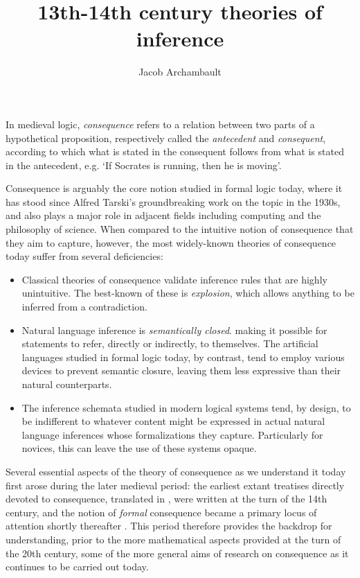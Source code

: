 \documentclass[]{article}
\title{13th-14th century theories of inference}
\author{Jacob Archambault}
\begin{document}
\maketitle

In medieval logic, 
\emph{consequence} refers to a relation between two parts of a hypothetical proposition, 
respectively called the \emph{antecedent} and \emph{consequent}, 
according to which what is stated in the consequent follows from what is stated in the antecedent, 
e.g. `If Socrates is running, then he is moving'. 

Consequence is arguably the core notion studied in formal logic today, 
where it has stood since Alfred Tarski's groundbreaking work on the topic in the 1930s, 
and also plays a major role in adjacent fields including computing and the philosophy of science. 
When compared to the intuitive notion of consequence that they aim to capture, 
however, 
the most widely-known theories of consequence today suffer from several deficiencies: 
\begin{itemize}
	\item Classical theories of consequence validate inference rules that are highly unintuitive. 
	The best-known of these is \emph{explosion}, 
	which allows anything to be inferred from a contradiction.
	\item Natural language inference is \emph{semantically closed}. 
	making it possible for statements to refer, 
	directly or indirectly, 
	to themselves. 
	The artificial languages studied in formal logic today, 
	by contrast, 
	tend to employ various devices to prevent semantic closure, 
	leaving them less expressive than their natural counterparts.
	\item The inference schemata studied in modern logical systems tend, 
	by design, 
	to be indifferent to whatever content might be expressed in actual natural language inferences whose formalizations they capture.
	Particularly for novices, this can leave the use of these systems opaque. 
\end{itemize}

Several essential aspects of the theory of consequence as we understand it today first arose during the later medieval period: 
the earliest extant treatises directly devoted to consequence, 
translated in \autocite{Archambault2017d}, 
were written at the turn of the 14th century, 
and the notion of \emph{formal} consequence became a primary locus of attention shortly thereafter \autocite{sep-consequence-medieval}. 
This period therefore provides the backdrop for understanding, 
prior to the more mathematical aspects provided at the turn of the 20th century, 
some of the more general aims of research on consequence as it continues to be carried out today. 
\end{document}
